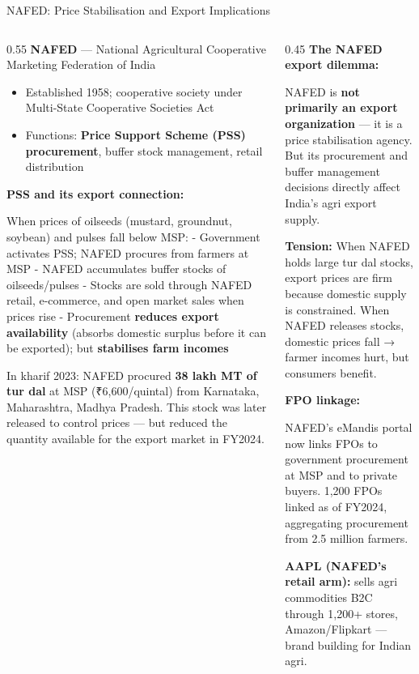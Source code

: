 \documentclass[
  ignorenonframetext,
  aspectratio=169,
]{beamer}
\makeatletter
\providecommand{\tightlist}{%
  \setlength{\itemsep}{0pt}\setlength{\parskip}{0pt}}
\let\quarto@originallabel\label
\DeclareRobustCommand*{\label}[1]{\quarto@originallabel{#1}}
\makeatother
\begin{document}
\begin{frame}{NAFED: Price Stabilisation and Export Implications}
\label{nafed-price-stabilisation-and-export-implications}
\begin{columns}[T]
\begin{column}{0.55\linewidth}
\textbf{NAFED} --- National Agricultural Cooperative Marketing
Federation of India

\begin{itemize}
\tightlist
\item
  Established 1958; cooperative society under Multi-State Cooperative
  Societies Act
\item
  Functions: \textbf{Price Support Scheme (PSS) procurement}, buffer
  stock management, retail distribution
\end{itemize}

\textbf{PSS and its export connection:}

When prices of oilseeds (mustard, groundnut, soybean) and pulses fall
below MSP: - Government activates PSS; NAFED procures from farmers at
MSP - NAFED accumulates buffer stocks of oilseeds/pulses - Stocks are
sold through NAFED retail, e-commerce, and open market sales when prices
rise - Procurement \textbf{reduces export availability} (absorbs
domestic surplus before it can be exported); but \textbf{stabilises farm
incomes}

In kharif 2023: NAFED procured \textbf{38 lakh MT of tur dal} at MSP
(₹6,600/quintal) from Karnataka, Maharashtra, Madhya Pradesh. This stock
was later released to control prices --- but reduced the quantity
available for the export market in FY2024.
\end{column}

\begin{column}{0.45\linewidth}
\textbf{The NAFED export dilemma:}

NAFED is \textbf{not primarily an export organization} --- it is a price
stabilisation agency. But its procurement and buffer management
decisions directly affect India's agri export supply.

\textbf{Tension:} When NAFED holds large tur dal stocks, export prices
are firm because domestic supply is constrained. When NAFED releases
stocks, domestic prices fall → farmer incomes hurt, but consumers
benefit.

\textbf{FPO linkage:}

NAFED's eMandis portal now links FPOs to government procurement at MSP
and to private buyers. 1,200 FPOs linked as of FY2024, aggregating
procurement from 2.5 million farmers.

\textbf{AAPL (NAFED's retail arm):} sells agri commodities B2C through
1,200+ stores, Amazon/Flipkart --- brand building for Indian agri.
\end{column}
\end{columns}
\end{frame}
\end{document}
